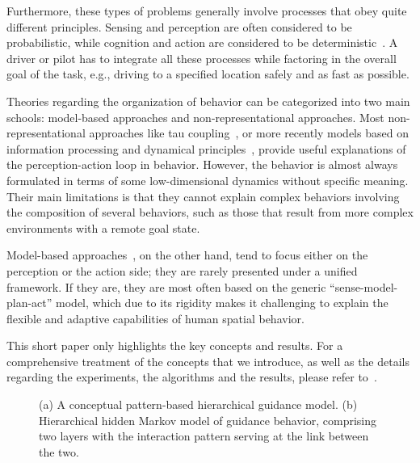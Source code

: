 \documentclass[journal]{IEEEtran}
\begin{document}
Furthermore, these types of problems generally involve processes that obey quite different principles. Sensing and perception are often considered to be probabilistic, while cognition and action are considered to be deterministic~\cite{campbell2010autonomous,mumford2002pattern}. A driver or pilot has to integrate all these processes while factoring in the overall goal of the task, e.g., driving to a specified location safely and as fast as possible.  



Theories regarding the organization of behavior can be categorized into two main schools: model-based approaches and non-representational approaches. Most non-representational approaches like tau coupling~\cite{lee1998guiding}, or more recently models based on information processing and dynamical principles~\cite{warren2006dynamics}, provide useful explanations of the perception-action loop in behavior. However, the behavior is almost always formulated in terms of some low-dimensional dynamics without specific meaning. Their main limitations is that they cannot explain complex behaviors involving the composition of several behaviors, such as those that result from more complex environments with a remote goal state. 

Model-based approaches~\cite{wolpert2000computational,todorov2004optimality}, on the other hand, tend to focus either on the perception or the action side; they are rarely presented under a unified framework. If they are, they are most often based on the generic ``sense-model-plan-act'' model, which due to its rigidity makes it challenging to explain the flexible and adaptive capabilities of human spatial behavior. 

This short paper only highlights the key concepts and results. For a comprehensive treatment of the concepts that we introduce, as well as the details regarding the experiments, the algorithms and the results, please refer to~\cite{kong2012pattern,kong2011foundations,kong2011investigation}.

\begin{figure}[!t]
\centering
{}
\caption{(a) A conceptual pattern-based hierarchical guidance model. (b) Hierarchical hidden Markov model of guidance behavior, comprising two layers with the interaction pattern serving at the link between the two.} \label{fig:Hierarchical_Markov_Model}
\end{figure}
\end{document}
